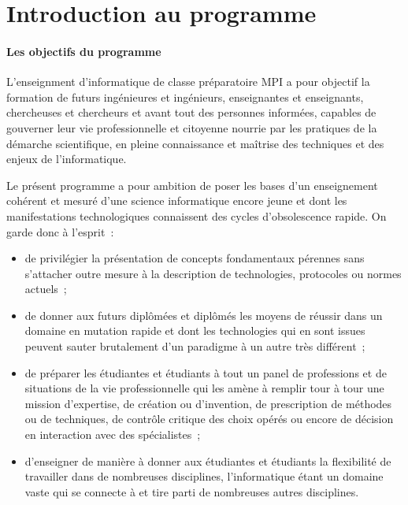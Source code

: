 \section*{Introduction au programme}


\paragraph{Les objectifs du programme} L'enseignment d'informatique de classe préparatoire MPI a pour objectif la formation de futurs ingénieures et ingénieurs, enseignantes et enseignants, chercheuses et chercheurs et avant tout des personnes informées, capables 
de gouverner leur vie professionnelle et citoyenne nourrie par les pratiques de la démarche scientifique, en pleine connaissance et maîtrise des techniques et des enjeux de l'informatique.

Le présent programme a pour ambition de poser les bases d'un enseignement cohérent et mesuré d'une science informatique encore jeune et dont les manifestations technologiques connaissent des cycles d'obsolescence rapide. On garde donc à l'esprit~: 
\begin{itemize}
\item de privilégier la présentation de concepts fondamentaux pérennes sans s’attacher outre mesure à la description de technologies, protocoles ou normes actuels~;
\item de donner aux futurs diplômées et diplômés les moyens de réussir dans un domaine en mutation rapide et dont les technologies qui en sont issues peuvent sauter brutalement d'un paradigme à un autre très différent~;
\item de préparer les étudiantes et étudiants à tout un panel de professions et de situations 
de la vie professionnelle qui les amène à remplir tour à tour une mission d'expertise, de création ou d'invention, de prescription de méthodes ou de techniques, de contrôle critique des choix opérés ou encore de décision en interaction avec des spécialistes~;
\item d'enseigner de manière à donner aux étudiantes et étudiants la flexibilité de travailler dans de nombreuses disciplines, l'informatique étant un domaine vaste qui se connecte à et tire parti de nombreuses autres disciplines.
\end{itemize}


